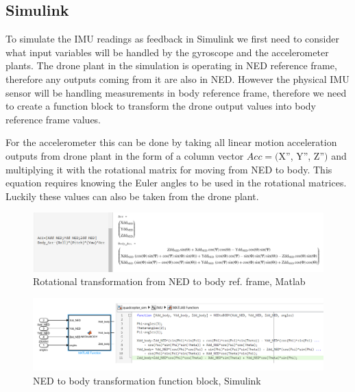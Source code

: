 \subsection{Simulink}
\begin{flushleft}
To simulate the IMU readings as feedback in Simulink we first need to consider what input variables will be handled by the gyroscope and the accelerometer plants. The drone plant in the simulation is operating in NED reference frame, therefore any outputs coming from it are also in NED. However the physical IMU sensor will be handling measurements in body reference frame, therefore we need to create a function block to transform the drone output values into body reference frame values. 

For the accelerometer this can be done by taking all linear motion acceleration outputs from drone plant in the form of a column vector $Acc=($X'', Y'', Z''$)$ and multiplying it with the rotational matrix for moving from NED to body. This equation requires knowing the Euler angles to be used in the rotational matrices. Luckily these values can also be taken from the drone plant.

\begin{figure}[H]
    \begin{center}
    \includegraphics[scale = 0.5]{pictures/IMU/NED_to_body_acc.png}
    \end{center}
    \caption{Rotational transformation from NED to body ref. frame, Matlab}
    \label{fig:my_label}
\end{figure}

\begin{figure}[H]
    \begin{center}
    \includegraphics[scale = 0.5]{pictures/IMU/NED_to_bidy_function_block.png}
    \end{center}
    \caption{NED to body transformation function block, Simulink}
    \label{fig:my_label}
\end{figure}


\end{flushleft}
